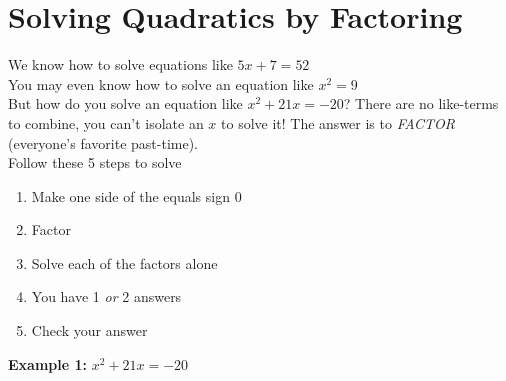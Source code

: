 \documentclass[11pt]{article}
\begin{document}
\pagebreak

\section*{Solving Quadratics by Factoring}

We know how to solve equations like $5x+7=52$\\

You may even know how to solve an equation like $x^2=9$\\

But how do you solve an equation like $x^2+21x=-20$? There are no like-terms to combine, you can't isolate an $x$ to solve it! The answer is to \textit{FACTOR} (everyone's favorite past-time). \\

Follow these 5 steps to solve \\

	\begin{enumerate}
		\item Make one side of the equals sign $0$\\
		
		\item Factor\\
		
		\item Solve each of the factors alone\\
		
		\item You have 1 \textit{or} 2 answers\\
		
		\item Check your answer\\
	\end{enumerate}

\textbf{Example 1:} $x^2+21x=-20$
\end{document}
